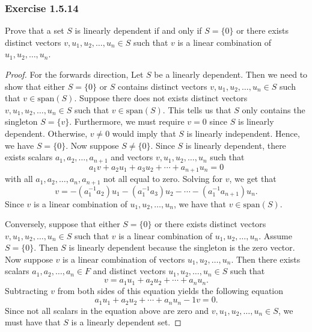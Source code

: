 \subsubsection{Exercise 1.5.14} Prove that a set \( S  \) is linearly dependent if and only if \( S = \{ 0  \}  \) or there exists distinct vectors \( v , u_{1}, u_{2}, \dots, u_{n} \in S  \) such that \( v  \) is a linear combination of \( u_{1}, u_{2}, \dots, u_{n} \).
\begin{proof}
    For the forwards direction, Let \( S  \) be a linearly dependent. Then we need to show that either \( S = \{ 0  \}  \) or \( S  \) contains distinct vectors \( v , u_{1}, u_{2} , \dots, u_{n} \in S  \) such that \( v \in \text{span}(S ) \). Suppose there does not exists distinct vectors  \( v , u_{1}, u_{2}, \dots, u_{n} \in  S  \) such that \( v \in \text{span}(S ) \). This tells us that \( S  \) only contains the singleton \( S = \{ v  \}  \). Furthermore, we must require \( v = 0  \) since \( S  \) is linearly dependent. Otherwise, \( v \neq 0  \) would imply that \( S  \) is linearly independent. Hence, we have \( S = \{ 0 \}  \).  
    Now suppose \( S \neq \{ 0 \}  \). Since \( S  \) is linearly dependent, there exists scalars \( a_{1}, a_{2}, \dots, a_{n+1} \)  and vectors \( v , u_{1}, u_{2}, \dots, u_{n}     \) such that 
    \[  a_{1} v +  a_{2} u_{1} + a_{3} u_{2} + \cdots + a_{n+1} u_{n} = 0   \] with all \( a_{1} , a_{2}, \dots , a_{n},  a_{n+1} \) not all equal to zero. Solving for \( v  \), we get that
    \[  v = -(a^{-1}_{1} a_{2} ) u_{1} - (a^{-1}_{1} a_{3}) u_{2} - \cdots - (a^{-1}_{1} a_{n+1}) u_{n}. \] 
    Since \( v  \) is a linear combination of \( u_{1}, u_{2}, \dots, u_{n}  \), we have that \( v \in \text{span}(S) \).

    Conversely, suppose that either \( S = \{ 0  \}  \) or there exists distinct vectors \( v , u_{1}, u_{2}, \dots, u_{n} \in S  \) such that \( v  \) is a linear combination of \( u_{1}, u_{2}, \dots, u_{n}   \). Assume \( S = \{ 0 \}  \). Then \( S  \) is linearly dependent because the singleton is the zero vector. Now suppose \( v  \) is a linear combination of vectors \( u_{1}, u_{2}, \dots, u_{n}  \). Then there exists scalars  \( a_{1}, a_{2}, \dots, a_{n} \in F  \) and distinct vectors \( u_{1}, u_{2}, \dots, u_{n} \in S  \) such that
    \[  v = a_{1} u_{1} + a_{2} u_{2} + \cdots + a_{n} u_{n}. \]
    Subtracting \( v  \) from both sides of this equation yields the following equation 
    \[  a_{1} u_{1} + a_{2} u_{2} + \cdots + a_{n} u_{n} - 1 v = 0.  \]
    Since not all scalars in the equation above are zero and \( v  , u_{1}, u_{2}, \dots, u_{n} \in S  \), we must have that \( S  \) is a linearly dependent set.
\end{proof}


